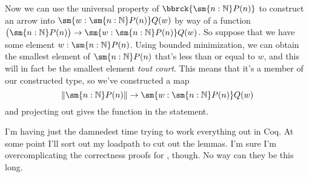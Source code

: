 Now we can use the universal property of $\bbrck{\sm{n:\mathbb{N}}P(n)}$ to
construct an arrow into $\sm{w : \sm{n:\mathbb{N}} P(n)} Q(w)$ by way of a
function $\big(\sm{n:\mathbb{N}} P(n)\big) \to \sm{w : \sm{n:\mathbb{N}} P(n)}
Q(w)$.  So suppose that we have some element $w : \sm{n:\mathbb{N}} P(n)$.
Using bounded minimization, we can obtain the smallest element of $\sm{n:
\mathbb{N}} P(n)$ that's less than or equal to $w$, and this will in fact be
the smallest element \textit{tout court}.  This means that it's a member of our
constructed type, so we've constructed a map
\[
  \left\lVert \sm{n:\mathbb{N}} P(n) \right\rVert
  \to
  \sm{w:\sm{n:\mathbb{N}}P(n)}Q(w)
\]
and projecting out gives the function in the statement.


I'm having just the damnedest time trying to work everything out in Coq.  At
some point I'll sort out my loadpath to cut out the  lemmas.  I'm sure I'm
overcomplicating the correctness proofs for , though.  No way can
they be this long.
